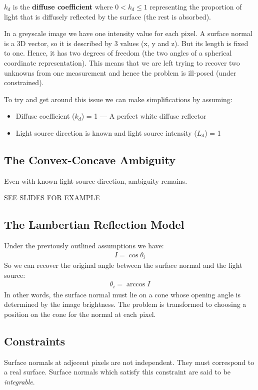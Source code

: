 \documentclass{article}
\begin{document}
$k_d$ is the \textbf{diffuse coefficient} where $0<k_d\le 1$ representing the proportion of light that is diffusely reflected by the surface (the rest is absorbed).

In a greyscale image we have one intensity value for each pixel.
A surface normal is a 3D vector, so it is described by 3 values (x, y and z).
But its length is fixed to one.
Hence, it has two degrees of freedom (the two angles of a spherical coordinate representation).
This means that we are left trying to recover two unknowns from one measurement and hence the problem is ill-posed (under constrained).

To try and get around this issue we can make simplifications by assuming:
\begin{itemize}
	\item Diffuse coefficient ($k_d$) = 1 --- A perfect white diffuse reflector
	\item Light source direction is known and light source intensity ($L_d$) = 1
\end{itemize}

\subsection{The Convex-Concave Ambiguity}
Even with known light source direction, ambiguity remains. %

SEE SLIDES FOR EXAMPLE

\subsection{The Lambertian Reflection Model }
Under the previously outlined assumptions we have:
\begin{align*}
I = \cos\theta_i
\end{align*}
So we can recover the original angle between the surface normal and the light source:
\begin{align*}
\theta_i = \arccos I
\end{align*}
In other words, the surface normal must lie on a cone whose opening angle is determined by the image brightness.
The problem is transformed to choosing a position on the cone for the normal at each pixel.

\subsection{Constraints}
Surface normals at adjecent pixels are not independent.
They must correspond to a real surface.
Surface normals which satisfy this constraint are said to be \textit{integrable}.
\end{document}
